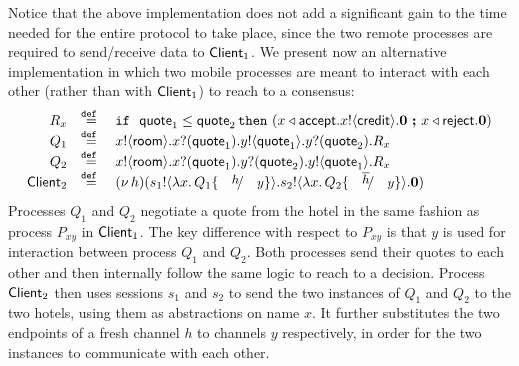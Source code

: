 \begin{example}
		Notice that the above implementation does not add a significant gain
to the time needed for the entire protocol to take
place, since the two remote processes are required
to send/receive data to $\mathsf{Client}_1$.
We present now an alternative implementation
in which two mobile processes are meant 
to interact with each other (rather than with $\mathsf{Client}_1$) to reach to a consensus:
%
\[
	\begin{array}{rcl}
	    R_x & \defeq & \If\ \Quote_1 \leq \Quote_2 \, \Then  (\bsel{x}{\accept} \bout{x}{\creditc} \inact \  \Else \ \bsel{x}{\reject} \inact) \\
		Q_1 &\defeq&	\bout{x}{\rtype} \binp{x}{\Quote_1} \bout{y}{\Quote_1} \binp{y}{\Quote_2} R_x \\
		Q_2 &\defeq&	\bout{x}{\rtype} \binp{x}{\Quote_1} \binp{y}{\Quote_2} \bout{y}{\Quote_1} R_x \\
		\Client_2 &\defeq& \newsp{h}{\bout{s_1}{\abs{x}{Q_1 \subst{h}{y}}} \bout{s_2}{\abs{x}{Q_2 \subst{\dual{h}}{y}}} \inact}
	\end{array}
\]
Processes $Q_1$ and $Q_2$  negotiate a quote from the
		hotel in the same fashion as process $P_{xy}$ in $\mathsf{Client}_1$.
		The key difference with respect to $P_{xy}$ is that $y$ is used for
		interaction between process $Q_1$ and $Q_2$. Both processes send
		their quotes to each other and then internally follow the same
		logic to reach to a decision.
		Process  $\mathsf{Client}_2$ then uses sessions $s_1$ and $s_2$ to send the two
		instances of $Q_1$ and $Q_2$ to the two hotels, using them 
	 as abstractions
		on name $x$. It further substitutes
		the two endpoints of a fresh channel $h$ to channels $y$ respectively,
		in order for the two instances to communicate with each other.




\end{example}
